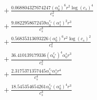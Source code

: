 \documentclass[10pt]{article}
\begin{document}
\begin{align*}
&{}  + \frac{0.068804327674247 \left(\alpha_{0}^s\right)^{6} r^{2} \log{\left(c_{s} \right)}^{4}}{c_{s}^{2}} \\
&{}  + \frac{9.0822958672459 \alpha_{0}^{c_s} \left(\alpha_{1}^s\right)^{2} r^{3}}{c_{s}^{3}} \\
&{}  + \frac{0.56835313693226 \left(\alpha_{0}^s\right)^{6} r^{2} \log{\left(c_{s} \right)}^{2}}{c_{s}^{2}} \\
&{}  + \frac{36.410139179336 \left(\alpha_{0}^{c_s}\right)^{4} \alpha_{0}^s r^{3}}{c_{s}^{3}} \\
&{}  + \frac{2.3175371357445 \alpha_{1}^{c_s} \alpha_{1}^s r^{4}}{c_{s}^{4}} \\
&{}  + \frac{18.545354654261 \alpha_{0}^{c_s} \left(\alpha_{0}^s\right)^{4} r^{3}}{c_{s}^{3}}
\end{align*}
\end{document}
